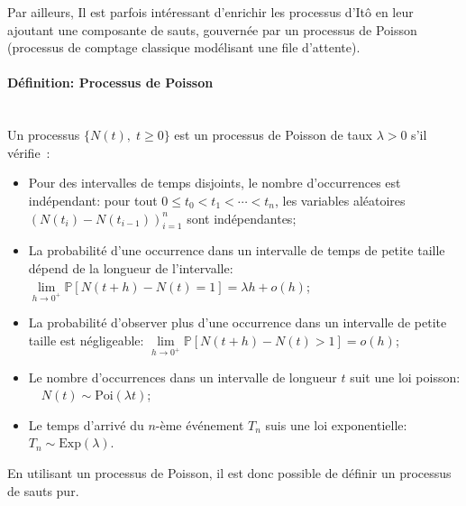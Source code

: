 Par ailleurs, Il est parfois intéressant d'enrichir les processus d'Itô en leur ajoutant une composante de sauts, gouvernée par un processus de Poisson (processus de comptage classique modélisant une file d'attente).
\paragraph{Définition: Processus de Poisson}\mbox{}\\
Un processus $\{N(t),\;t\geq0\}$ est un processus de Poisson de taux $\lambda>0$ s'il vérifie~\cite{lefebvre2007}:
\begin{itemize}
    \item Pour des intervalles de temps disjoints, le nombre d'occurrences est indépendant: pour tout $0 \leq t_0 < t_1 < \cdots < t_n$, les variables aléatoires ${\left(N(t_i) - N(t_{i-1})\right)}_{i=1}^n$ sont indépendantes;
    \item La probabilité d'une occurrence dans un intervalle de temps de petite taille dépend de la longueur de l'intervalle: \(\underset{h\to0^+}{\lim}\mathds{P}[N(t+h)-N(t)=1]=\lambda h+o(h)\);
    \item La probabilité d'observer plus d'une occurrence dans un intervalle de petite taille est négligeable: \(\underset{h\to0^+}{\lim}\mathds{P}[N(t+h)-N(t)>1]=o(h)\);
    \item Le nombre d'occurrences dans un intervalle de longueur $t$ suit une loi poisson: \(\quad N(t)\sim \text{Poi}(\lambda t)\);
    \item Le temps d'arrivé du $n$-ème événement $T_n$ suis une loi exponentielle: \(T_n\sim\text{Exp}(\lambda)\).
\end{itemize}
En utilisant un processus de Poisson, il est donc possible de définir un processus de sauts pur.
